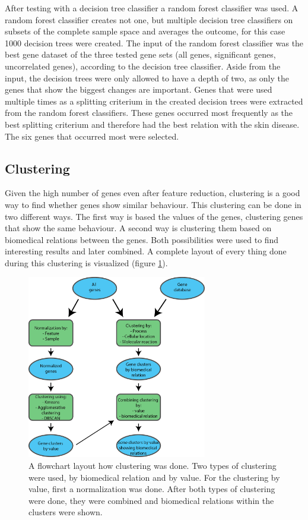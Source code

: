 \documentclass[10pt,a4paper]{article}
\begin{document}
	After testing with a decision tree classifier a random forest classifier was used. A random forest classifier creates not one, but multiple decision tree classifiers on subsets of the complete sample space and averages the outcome, for this case 1000 decision trees were created. The input of the random forest classifier was the best gene dataset of the three tested gene sets (all genes, significant genes, uncorrelated genes), according to the decision tree classifier. Aside from the input, the decision trees were only allowed to have a depth of two, as only the genes that show the biggest changes are important. Genes that were used multiple times as a splitting criterium in the created decision trees were extracted from the random forest classifiers. These genes occurred most frequently as the best splitting criterium and therefore had the best relation with the skin disease. The six genes that occurred most were selected.
	
	\subsection{Clustering}
	\label{subsec:MethodsPositionalClustering}
	
	Given the high number of genes even after feature reduction, clustering is a good way to find whether genes show similar behaviour. This clustering can be done in two different ways. The first way is based the values of the genes, clustering genes that show the same behaviour. A second way is clustering them based on biomedical relations between the genes. Both possibilities were used to find interesting results and later combined. A complete layout of every thing done during this clustering is visualized (figure \ref{fig:ClusteringLayout}).
	
		\begin{figure}[H]
		\includegraphics[width=0.7\textwidth]{ClusteringLayout.png}
		\caption{A flowchart layout how clustering was done. Two types of clustering were used, by biomedical relation and by value. For the clustering by value, first a normalization was done. After both types of clustering were done, they were combined and biomedical relations within the clusters were shown.}
		\label{fig:ClusteringLayout}
	\end{figure}
	
\end{document}
